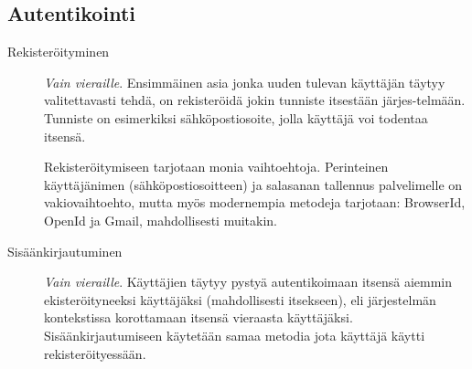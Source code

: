 \documentclass[a4paper,12pt]{report}
\begin{document}
\subsection{Autentikointi}
\begin{description}
   \item[Rekisteröityminen]  \emph{Vain vieraille}. Ensimmäinen asia jonka uuden
      tulevan käyt\-täjän täytyy valitettavasti tehdä, on rekisteröidä jokin
      tunniste itsestään järjes-telmään.  Tunniste on esimerkiksi
      sähköpostiosoite, jolla käyttäjä voi todentaa itsensä.

      Rekisteröitymiseen tarjotaan monia vaihtoehtoja. Perinteinen käyttäjänimen
      (sähköpostiosoitteen) ja salasanan tallennus palvelimelle on
      vakiovaihtoehto, mutta myös modernempia metodeja tarjotaan: BrowserId,
      OpenId ja Gmail, mahdollisesti muitakin.

   \item[Sisäänkirjautuminen]  \emph{Vain vieraille}. Käyttäjien täytyy pystyä
      autentikoimaan itsensä aiemmin ekiste\-röityneeksi käyttäjäksi
      (mahdollisesti itsekseen), eli järjes\-telmän kontekstissa korottamaan
      itsensä vieraasta käyttäjäksi.  Sisään\-kirjautumiseen käy\-tetään samaa
      metodia jota käyttäjä käytti rekisteröityessään.
\end{description}
\end{document}
